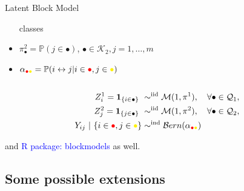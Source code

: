 \documentclass[compress,10pt]{beamer}
\newcommand{\bpi}{\mathbf{\pi}}
\begin{document}
\begin{frame}
\begin{center}
\begin{overlayarea}{\textwidth}{.5\textheight}
\begin{columns}
\begin{column}{.5\paperwidth}
\begin{small}
\begin{block}{Latent Block Model}
\begin{itemize}
                classes
               \item  $\pi^2_\bullet  =  \mathbb{P}(j  \in  \bullet)$,
                $\bullet\in\mathcal{K}_2,j=1,\dots,m$
              \item      $\alpha_{\textcolor{red}{\bullet}\textcolor{yellow}{\bullet}}     =      \mathbb{P}(i
                \leftrightarrow j | i\in\textcolor{red}{\bullet},j\in\textcolor{yellow}{\bullet})$
              \end{itemize}
            \end{block}
          \end{small}
        \end{column}
      \end{columns}
    \end{overlayarea}
  \end{center}
  

\begin{align*}
Z^1_i = \mathbf{1}_{\{i \in \bullet\}}  \ & \sim^{\text{iid}} \mathcal{M}(1,\bpi^1), \quad \forall\bullet \in \mathcal{Q}_1, \\ 
Z^2_j=\mathbf{1}_{\{j \in \bullet\}}  \ & \sim^{\text{iid}} \mathcal{M}(1,\bpi^2), \quad \forall\bullet \in \mathcal{Q}_2, \\
Y_{ij} \ | \ \{i\in\textcolor{red}{\bullet},j\in\textcolor{yellow}{\bullet}\}
& \sim^{\text{ind}} \mathcal{B}ern(\alpha_{\textcolor{red}{\bullet}\textcolor{yellow}{\bullet}})\\
\end{align*}


\textcolor{blue}{\cite{Govaert2008}} and 
\textcolor{blue}{R package: blockmodels} as well.

\end{frame}






\subsection{Some possible extensions}
\end{document}
